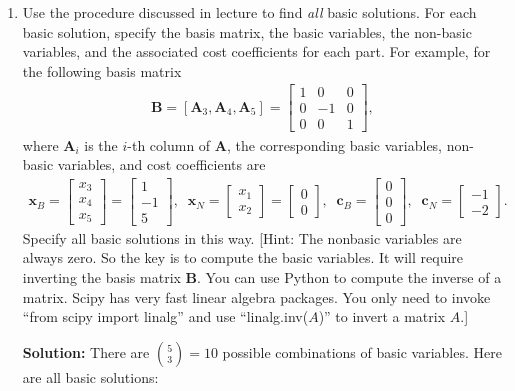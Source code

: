 \documentclass[11pt]{article}
\newcommand{\mb}[1]{\ensuremath{\boldsymbol{#1}}}
\begin{document}
\begin{enumerate}
\begin{enumerate}
		\item Use the procedure discussed in lecture to find \textit{all} basic solutions. For each basic solution, specify the basis matrix, the basic variables, the non-basic variables, and the associated cost coefficients for each part. For example, for the following basis matrix \begin{align*}
		\mb{B}=[\mb{A}_3,\mb{A}_4,\mb{A}_5]=\begin{bmatrix}1 & 0 & 0 \\ 0 & -1 & 0 \\ 0 & 0 & 1 \end{bmatrix},
		\end{align*}
		where $\mb{A}_i$ is the $i$-th column of $\mb{A}$, the corresponding basic variables, non-basic variables, and cost coefficients are
		\begin{align*}
		\mb{x}_B = \begin{bmatrix} x_3\\x_4\\x_5\end{bmatrix}=\begin{bmatrix} 1\\-1\\5\end{bmatrix}, \;\; \mb{x}_N = \begin{bmatrix} x_1\\x_2\end{bmatrix}=\begin{bmatrix} 0\\0\end{bmatrix},\;\; \mb{c}_B=\begin{bmatrix} 0\\0\\0\end{bmatrix},\;\;\mb{c}_N=\begin{bmatrix} -1\\-2\end{bmatrix}.
		\end{align*} 
		Specify all basic solutions in this way. [Hint: The nonbasic variables are always zero. So the key is to compute the basic variables. It will require inverting the basis matrix $\mb{B}$. You can use Python to compute the inverse of a matrix. Scipy has very fast linear algebra packages. You only need to invoke ``from scipy import linalg'' and use ``linalg.inv($A$)'' to invert a matrix $A$.]
		
		\textbf{Solution:}
		There are $\binom{5}{3} = 10$ possible combinations of basic variables. Here are all basic solutions:
		

\end{enumerate}
\end{enumerate}
\end{document}
